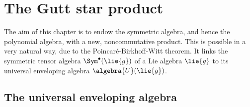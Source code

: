\section{The Gutt star product}
\label{sec:chap3_GuttStar}

The aim of this chapter is to endow the symmetric algebra, and hence the polynomial 
algebra, with a new, noncommutative product. This is possible in a very 
natural way, due to the Poincar\'e-Birkhoff-Witt theorem. It links the 
symmetric tensor algebra $\Sym^{\bullet}(\lie{g})$ of a Lie algebra $\lie{g}$ 
to its universal enveloping algebra $\algebra{U}(\lie{g})$.


\subsection{The universal enveloping algebra}
\label{subsec:chap3_UniversalEnvelopingAlgebra}

